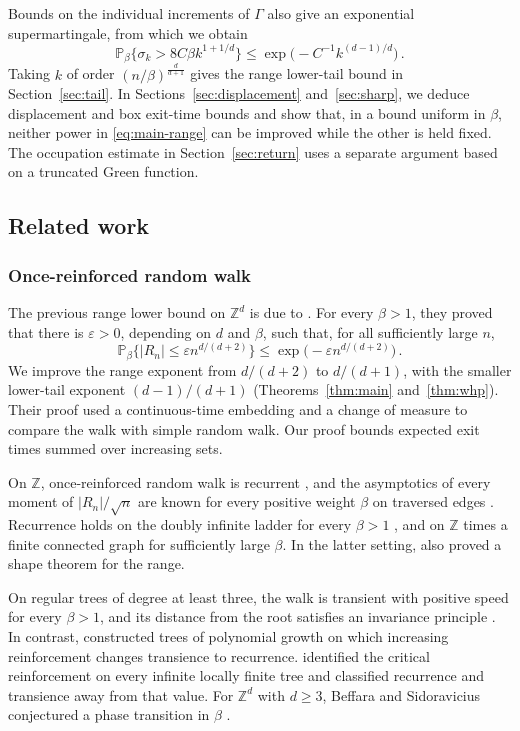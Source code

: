 \documentclass[11pt]{amsart}
\theoremstyle{plain}
\theoremstyle{definition}
\newcommand{\Z}{\mathbb Z}
\renewcommand{\P}{\mathbb P}
\begin{document}
	Bounds on the individual increments of $\Gamma$ also give an exponential
	supermartingale, from which we obtain
	\[
	\P_\beta\{\sigma_k>8C\beta k^{1+1/d}\}
	\leq\exp\bigl(-C^{-1}k^{(d-1)/d}\bigr)\, .
	\]
	Taking $k$ of order $(n/\beta)^{\frac{d}{d+1}}$ gives the range lower-tail
	bound in Section~\ref{sec:tail}. In Sections~\ref{sec:displacement}
	and~\ref{sec:sharp}, we deduce displacement and box exit-time bounds and
	show that, in a bound uniform in $\beta$, neither power in \eqref{eq:main-range} can be improved
	while the other is held fixed. The occupation estimate in Section~\ref{sec:return}
	uses a separate argument based on a truncated Green function.

	\subsection{Related work}\label{ssec:related-work}

	\subsubsection{Once-reinforced random walk}
	The previous range lower bound on $\Z^d$ is due to
	\citet[Theorem~1.1]{CollevecchioTarres2025}. For every $\beta>1$, they
	proved that there is $\varepsilon>0$, depending on $d$ and $\beta$, such
	that, for all sufficiently large $n$,
	\[
	\P_\beta\{|R_n|\leq\varepsilon n^{d/(d+2)}\}
	\leq\exp\bigl(-\varepsilon n^{d/(d+2)}\bigr)\, .
	\]
	We improve the range exponent from $d/(d+2)$ to $d/(d+1)$, with the
	smaller lower-tail exponent $(d-1)/(d+1)$
	(Theorems~\ref{thm:main} and~\ref{thm:whp}). Their proof used a
	continuous-time embedding and a change of measure to compare the walk
	with simple random walk. Our proof bounds expected exit times summed
	over increasing sets.

	On $\Z$, once-reinforced random walk is recurrent
	\citep[Theorem~3.2]{Davis1990}, and the asymptotics of every moment of
	$|R_n|/\sqrt n$ are known for every positive weight $\beta$ on traversed edges
	\citep[Theorem~1]{PfaffelhuberStiefel2021}.
	Recurrence holds on the doubly infinite ladder for every $\beta>1$
	\citep[Theorem~2.1]{Sellke2006}, and on $\Z$ times a finite connected
	graph for sufficiently large $\beta$. In the latter setting,
	\citet{KiousSchapiraSingh2021} also proved a shape theorem for the range.

	On regular trees of degree at least three, the walk is transient with
	positive speed for every $\beta>1$, and its distance from the root
	satisfies an invariance principle \citep{DurrettKestenLimic2002}.
	In contrast, \citet{KiousSidoravicius2018} constructed trees of polynomial
	growth on which increasing reinforcement changes transience to
	recurrence. \citet[Theorem~1]{CollevecchioKiousSidoravicius2020}
	identified the critical reinforcement on every infinite locally finite
	tree and classified recurrence and transience away from that value.
	For $\Z^d$ with $d\geq3$, Beffara and Sidoravicius conjectured a phase
	transition in $\beta$ \citep[Section~2]{Kozma2012}.
\end{document}
